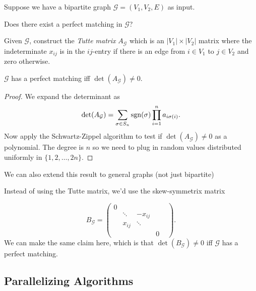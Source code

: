 \documentclass[11 pt]{scrartcl}
\begin{document}
\begin{example}
    Suppose we have a bipartite graph $\mathcal{G} = (V_1, V_2, E)$ as input. 

    \begin{question}
        Does there exist a perfect matching in $\mathcal{G}$?
    \end{question}
    
    Given $\mathcal{G}$, construct the \emph{Tutte matrix} $A_\mathcal{G}$ which is an $|V_1|\times|V_2|$ matrix where the indeterminate $x_{ij}$ is in the $ij$-entry if there is an edge from $i\in V_1$ to $j\in V_2$ and zero otherwise. 

    \begin{claim}
        $\mathcal{G}$ has a perfect matching iff $\det(A_\mathcal{G}) \not= 0$. 
    \end{claim}
    \begin{proof}
        We expand the determinant as 
        \[ \det(A_{\mathcal{G}}) = \sum_{\sigma\in S_n} \text{sgn}(\sigma) \prod_{i=1}^n a_{i\sigma(i)}.\] 
        Now apply the Schwartz-Zippel algorithm to test if $\det(A_{\mathcal{G}}) \not= 0$ as a polynomial. The degree is $n$ so we need to plug in random values distributed uniformly in $\{1, 2, \dots, 2n\}$. 
    \end{proof}
\end{example}

We can also extend this result to general graphs (not just bipartite)
\begin{example}
    Instead of using the Tutte matrix, we'd use the skew-symmetrix matrix 

    \[ B_{\mathcal{G}} = \begin{pmatrix} 0 & & & \\ 
                                          & \ddots & -x_{ij} & & \\ 
                                            & x_{ij} & \ddots & \\ 
                                            &   & & 0 \end{pmatrix}.\] 
        We can make the same claim here, which is that $\det(B_{\mathcal{G}}) \not= 0$ iff $\mathcal{G}$ has a perfect matching. 
\end{example}

\subsection{Parallelizing Algorithms}
\end{document}
